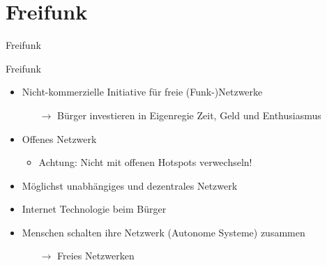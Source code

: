 \section{Freifunk}
\begin{frame}{}
    \begin{center}
        Freifunk
     \end{center}
\end{frame}

\begin{frame}{Freifunk}
    \begin{itemize}
        \item Nicht-kommerzielle Initiative für freie (Funk-)Netzwerke
        \begin{itemize}
            \item[$\rightarrow$] Bürger investieren in Eigenregie Zeit, Geld und Enthusiasmus
        \end{itemize}
        \item Offenes Netzwerk
        \begin{itemize}
            \item {\color{red}Achtung:} Nicht mit offenen Hotspots verwechseln!
        \end{itemize}
        \item Möglichst unabhängiges und dezentrales Netzwerk
        \item Internet Technologie beim Bürger
        \item Menschen schalten ihre Netzwerk (Autonome Systeme) zusammen
        \begin{itemize}
            \item[$\rightarrow$] Freies Netzwerken
        \end{itemize}
    \end{itemize}
\end{frame}

